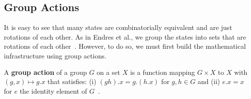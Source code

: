 


\subsection{Group Actions}

It is easy to see that many states are combinatorially equivalent and are just rotations of each other. As in Endres et al., we group the states into sets that are rotations of each other~\cite{Endres2005}. However, to do so, we must first build the mathematical infrastructure using group actions. 

\begin{mydef}%
A \textbf{group action} of a group $G$ on a set $X$ is a function mapping $G \times X$ to $X$ with $(g, x) \mapsto g.x$ that satisfies: (i) $(gh).x = g.(h.x)$ for $g,h \in G$ and (ii) $e.x = x$ for $e$ the identity element of $G$~\cite{Rotman1995}.
\end{mydef}

